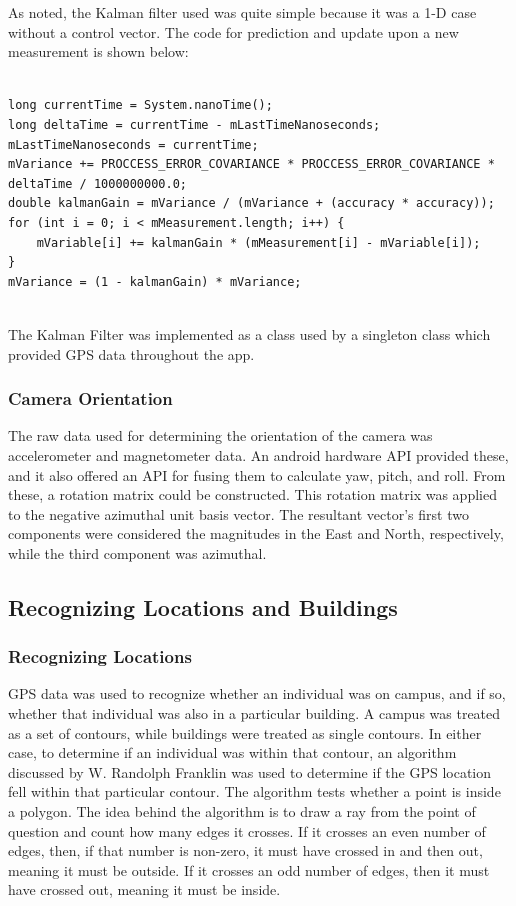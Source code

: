 \documentclass[12pt,journal,compsoc]{IEEEtran}
\begin{document}
As noted, the Kalman filter used was quite simple because it was a 1-D case without a control vector. The code for prediction and update upon a new measurement is shown below:

\begin{lstlisting}

long currentTime = System.nanoTime();
long deltaTime = currentTime - mLastTimeNanoseconds;
mLastTimeNanoseconds = currentTime;
mVariance += PROCCESS_ERROR_COVARIANCE * PROCCESS_ERROR_COVARIANCE * deltaTime / 1000000000.0;
double kalmanGain = mVariance / (mVariance + (accuracy * accuracy));
for (int i = 0; i < mMeasurement.length; i++) {
    mVariable[i] += kalmanGain * (mMeasurement[i] - mVariable[i]);
}
mVariance = (1 - kalmanGain) * mVariance;
        
\end{lstlisting}

The Kalman Filter was implemented as a class used by a singleton class which provided GPS data throughout the app.

\subsubsection{Camera Orientation}

The raw data used for determining the orientation of the camera was accelerometer and magnetometer data. An android hardware API provided these, and it also offered an API for fusing them to calculate yaw, pitch, and roll. From these, a rotation matrix could be constructed. This rotation matrix was applied to the negative azimuthal unit basis vector. The resultant vector's first two components were considered the magnitudes in the East and North, respectively, while the third component was azimuthal. 

\subsection{Recognizing Locations and Buildings}

\subsubsection{Recognizing Locations}

GPS data was used to recognize whether an individual was on campus, and if so, whether that individual was also in a particular building. A campus was treated as a set of contours, while buildings were treated as single contours. In either case, to determine if an individual was within that contour, an algorithm discussed by W. Randolph Franklin \cite{polygon} was used to determine if the GPS location fell within that particular contour. The algorithm tests whether a point is inside a polygon. The idea behind the algorithm is to draw a ray from the point of question and count how many edges it crosses. If it crosses an even number of edges, then, if that number is non-zero, it must have crossed in and then out, meaning it must be outside. If it crosses an odd number of edges, then it must have crossed out, meaning it must be inside.
\end{document}
